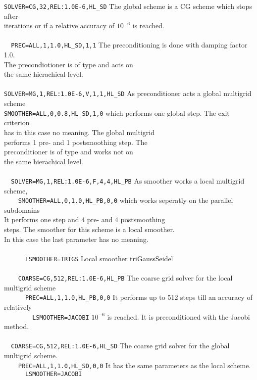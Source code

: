 \begin{tabbing}
\verb+SOLVER=CG,32,REL:1.0E-6,HL_SD+ \phantom{xxxxxxx} \=   The global scheme is a CG scheme which stops after \\
				       iterations or if a relative accuracy of $10^{-6}$ is reached. \\
\\
\verb+  PREC=ALL,1,1.0,HL_SD,1,1+   \>   The preconditioning is done with damping factor 1.0.  \\
                                    \>   The precondiotioner is of \scarc{} type and acts on \\
				    \>   the same hierachical level.  \\
\\    
\verb+SOLVER=MG,1,REL:1.0E-6,V,1,1,HL_SD+  \>  As preconditioner acts a global multigrid scheme  \\
\verb+SMOOTHER=ALL,0,0.8,HL_SD,1,0+  \>   which performs one global step. The exit criterion  \\
                                     \>    has in this case no meaning. The global multigrid  \\
				     \>   performs 1 pre- and 1 postsmoothing step. The  \\
				     \>   preconditioner is of \scarc{} type and works not on \\
				     \>   the same hierachical level.  \\
\\				   
\verb+  SOLVER=MG,1,REL:1.0E-6,F,4,4,HL_PB+   \> As smoother works a local multigrid scheme,   \\
\verb+    SMOOTHER=ALL,0,1.0,HL_PB,0,0+   \>   which works seperatly on the parallel subdomains  \\
                                           \> It performs one step and 4 pre- and 4 postsmoothing \\
					\>  steps. The smoother for this scheme is a local smoother. \\
					\> In this case the last parameter has no meaning.  \\
\\      
\verb+      LSMOOTHER=TRIGS+      \>            Local smoother triGaussSeidel  \\
\\	
\verb+    COARSE=CG,512,REL:1.0E-6,HL_PB+  \>   The coarse grid solver for the local multigrid scheme \\
\verb+      PREC=ALL,1,1.0,HL_PB,0,0+   \>     It performs up to 512 steps till an accuracy of relatively  \\
\verb+        LSMOOTHER=JACOBI+      \>        $10^{-6}$ is reached. It is preconditioned with the Jacobi method.\\
\\	  
\verb+  COARSE=CG,512,REL:1.0E-6,HL_SD+    \>        The coarse grid solver for the global multigrid scheme.\\
\verb+    PREC=ALL,1,1.0,HL_SD,0,0+     \>       It has the same parameters as the local scheme.\\
\verb+      LSMOOTHER=JACOBI+
\end{tabbing}

